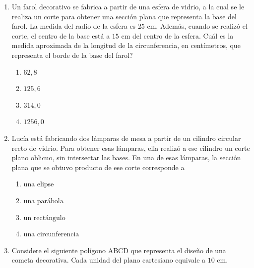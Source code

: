 \documentclass[12pt]{article}
\newcommand{\opcion}[2]{\item $#2$}
\newcommand{\puntotamanoestandar}{0.08cm}
\begin{document}
\begin{enumerate}[label=\textbf{\arabic*.}, itemsep=2.5cm]
\Needspace{0.55\textheight}
\item
Un farol decorativo se fabrica a partir de una esfera de vidrio, a la cual se le realiza un corte para obtener una secci\'on plana que representa la base del farol. La medida del radio de la esfera es $25$ cm. Adem\'as, cuando se realiz\'o el corte, el centro de la base est\'a a $15$ cm del centro de la esfera. \textquestiondown Cu\'al es la medida aproximada de la longitud de la circunferencia, en cent\'imetros, que representa el borde de la base del farol?

\begin{enumerate}[label=\Alph*)]
  \opcion{A}{62,8}
  \opcion{B}{125,6}
  \opcion{C}{314,0}
  \opcion{D}{1256,0}
\end{enumerate}

\Needspace{0.55\textheight}
\item
Luc\'ia est\'a fabricando dos l\'amparas de mesa a partir de un cilindro circular recto de vidrio. Para obtener esas l\'amparas, ella realiz\'o a ese cilindro un corte plano oblicuo, sin intersectar las bases. En una de esas l\'amparas, la secci\'on plana que se obtuvo producto de ese corte corresponde a

\begin{enumerate}[label=\Alph*)]
  \opcion{A}{\text{una elipse}}
  \opcion{B}{\text{una par\'abola}}
  \opcion{C}{\text{un rect\'angulo}}
  \opcion{D}{\text{una circunferencia}}
\end{enumerate}

\Needspace{0.88\textheight}
\item
Considere el siguiente pol\'igono ABCD que representa el dise\~no de una cometa decorativa. Cada unidad del plano cartesiano equivale a $10$ cm.

\begin{center}
\end{center}


\end{enumerate}
\end{document}
